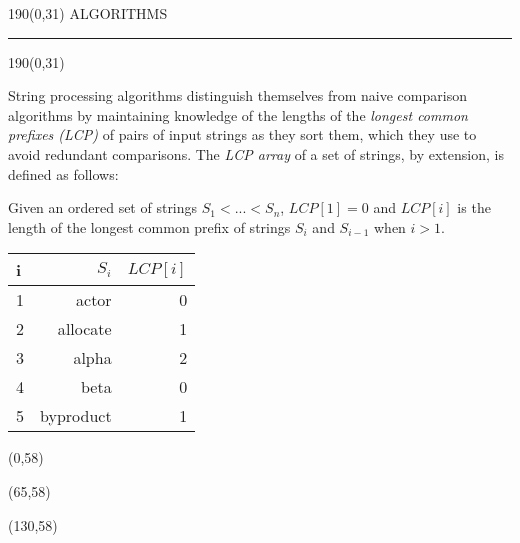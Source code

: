 \begin{textblock}{190}(0,31)
\sffamily\normalsize{\color{sciorange}ALGORITHMS}\small\\
\rule[3mm]{190mm}{0.1pt}
\end{textblock}
\begin{textblock}{190}(0,31)
\begin{multicols}{3}
\footnotesize
String processing algorithms distinguish themselves from naive comparison
algorithms by maintaining knowledge of the lengths of the {\em longest common
prefixes (LCP)} of pairs of input strings as they sort them, which they use to
avoid redundant comparisons.  The {\em LCP array} of a set of strings, by
extension, is defined as follows:
    
    Given an ordered set of strings $S_1 < ... < S_n$,
    $LCP[1] = 0$ and $LCP[i]$ is the length of the longest common prefix of
    strings $S_i$ and $S_{i-1}$ when $i > 1$.

\begin{tabular}{lrr}
    i&  $S_i$&          $LCP[i]$\\ \hline
    1&  actor&        0\\
    2&  {\color{red}a}llocate&   1\\
    3&  {\color{red}al}pha&      2\\
    4&  beta&         0\\
    5&  {\color{red}b}yproduct&  1\\
\end{tabular}
    
\end{multicols}
\end{textblock}
\begin{textblock}{60}(0,58)
    
\end{textblock}

\begin{textblock}{60}(65,58)
    
\end{textblock}

\begin{textblock}{60}(130,58)
    
\end{textblock}

